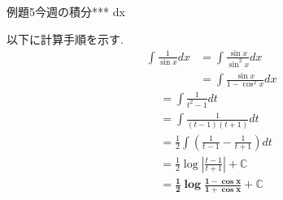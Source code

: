 \documentclass[main]{subfiles}
\begin{document}

\begin{newmondai}{例題}{5}{今週の積分}{***}
    \int {} dx
\end{newmondai}


\solutionhead
\hfill
以下に計算手順を示す.
\hfill\
\begin{align*}
    \int \frac{1}{\sin x} dx
        &= \int \frac{\sin x}{\sin^2 x} dx \\
        &= \int \frac{\sin x}{1-\cos^2 x} dx
\end{align*}
\begin{align*}
        &= \int \frac{1}{t^2-1} dt \\
        &= \int \frac{1}{(t-1)(t+1)} dt \\
        &= \frac{1}{2}\int \left(\frac{1}{t-1}-\frac{1}{t+1}\right) dt \\
        &= \frac{1}{2} \log \left|\frac{t-1}{t+1}\right|+\mathbb{C}  \\
        &= \boldsymbol{\frac{1}{2} \log \frac{1-\cos x}{1+\cos x}+\mathbb{C}}
\end{align*}
\end{document}

